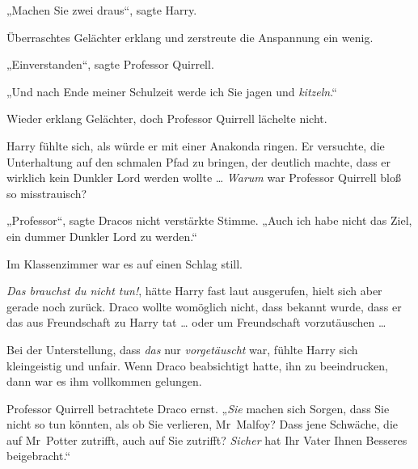 „Machen Sie zwei draus“, sagte Harry.

Überraschtes Gelächter erklang und zerstreute die Anspannung ein wenig.

„Einverstanden“, sagte Professor Quirrell.

„Und nach Ende meiner Schulzeit werde ich Sie jagen und \emph{kitzeln}.“

Wieder erklang Gelächter, doch Professor Quirrell lächelte nicht.

Harry fühlte sich, als würde er mit einer Anakonda ringen. Er versuchte, die Unterhaltung auf den schmalen Pfad zu bringen, der deutlich machte, dass er wirklich kein Dunkler Lord werden wollte … \emph{Warum} war Professor Quirrell bloß so misstrauisch?

„Professor“, sagte Dracos nicht verstärkte Stimme.
„Auch ich habe nicht das Ziel, ein dummer Dunkler Lord zu werden.“

Im Klassenzimmer war es auf einen Schlag still.

\emph{Das brauchst du nicht tun!}, hätte Harry fast laut ausgerufen, hielt sich aber gerade noch zurück. Draco wollte womöglich nicht, dass bekannt wurde, dass er das aus Freundschaft zu Harry tat … oder um Freundschaft vorzutäuschen …

Bei der Unterstellung, dass \emph{das} nur \emph{vorgetäuscht} war, fühlte Harry sich kleingeistig und unfair. Wenn Draco beabsichtigt hatte, ihn zu beeindrucken, dann war es ihm vollkommen gelungen.

Professor Quirrell betrachtete Draco ernst.
„\emph{Sie} machen sich Sorgen, dass Sie nicht so tun könnten, als ob Sie verlieren, Mr~Malfoy? Dass jene Schwäche, die auf Mr~Potter zutrifft, auch auf Sie zutrifft? \emph{Sicher} hat Ihr Vater Ihnen Besseres beigebracht.“


